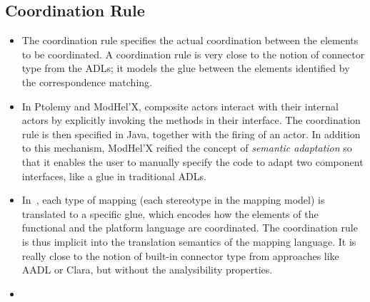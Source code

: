 \subsection{Coordination Rule}
		\begin{itemize}
			\item The coordination rule specifies the actual coordination between the elements to be coordinated. A coordination rule is very close to the notion of connector type from the ADLs; it models the glue between the elements identified by the correspondence matching.
			
			\item In Ptolemy and ModHel'X, composite actors interact with their internal actors by explicitly invoking the methods in their interface. The coordination rule is then specified in Java, together with the firing of an actor. In addition to this mechanism, ModHel'X reified the concept of \emph{semantic adaptation} so that it enables the user to manually specify the code to adapt two component interfaces, like a glue in traditional ADLs.
			
			\item In~\cite{dinatale}, each type of mapping (\ie each stereotype in the mapping model) is translated to a specific glue, which encodes how the elements of the functional and the platform language are coordinated. The coordination rule is thus implicit into the translation semantics of the mapping language. It is really close to the notion of built-in connector type from approaches like AADL or Clara, but without the analysibility properties.        
			
			\item {}  
		\end{itemize}
		
